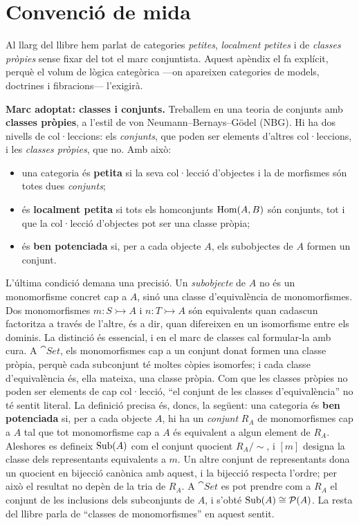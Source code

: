 \chapter{Convenció de mida}
\label{cap:mida}

Al llarg del llibre hem parlat de categories \emph{petites}, \emph{localment petites} i de \emph{classes pròpies} sense fixar del tot el marc conjuntista. Aquest apèndix el fa explícit, perquè el volum de lògica categòrica ---on apareixen categories de models, doctrines i fibracions--- l'exigirà.

\medskip
\noindent\textbf{Marc adoptat: classes i conjunts.} Treballem en una teoria de conjunts amb \textbf{classes pròpies}, a l'estil de von Neumann--Bernays--Gödel (NBG). Hi ha dos nivells de col·leccions: els \emph{conjunts}, que poden ser elements d'altres col·leccions, i les \emph{classes pròpies}, que no. Amb això:
\begin{itemize}
  \item una categoria és \textbf{petita} si la seva col·lecció d'objectes i la de morfismes són totes dues \emph{conjunts};
  \item és \textbf{localment petita} si tots els homconjunts $\operatorname{Hom}(A,B)$ són conjunts, tot i que la col·lecció d'objectes pot ser una classe pròpia;
  \item és \textbf{ben potenciada} si, per a cada objecte $A$, els subobjectes de $A$ formen un conjunt.
\end{itemize}
L'última condició demana una precisió. Un \emph{subobjecte} de $A$ no és un monomorfisme concret cap a $A$, sinó una classe d'equivalència de monomorfismes. Dos monomorfismes $m\colon S\rightarrowtail A$ i $n\colon T\rightarrowtail A$ són equivalents quan cadascun factoritza a través de l'altre, és a dir, quan difereixen en un isomorfisme entre els dominis. La distinció és essencial, i en el marc de classes cal formular-la amb cura. A $\cat{Set}$, els monomorfismes cap a un conjunt donat formen una classe pròpia, perquè cada subconjunt té moltes còpies isomorfes; i cada classe d'equivalència és, ella mateixa, una classe pròpia. Com que les classes pròpies no poden ser elements de cap col·lecció, \enquote{el conjunt de les classes d'equivalència} no té sentit literal. La definició precisa és, doncs, la següent: una categoria és \textbf{ben potenciada} si, per a cada objecte $A$, hi ha un \emph{conjunt} $R_A$ de monomorfismes cap a $A$ tal que tot monomorfisme cap a $A$ és equivalent a algun element de $R_A$. Aleshores es defineix $\operatorname{Sub}(A)$ com el conjunt quocient $R_A/{\sim}$, i $[m]$ designa la classe dels representants equivalents a $m$. Un altre conjunt de representants dona un quocient en bijecció canònica amb aquest, i la bijecció respecta l'ordre; per això el resultat no depèn de la tria de $R_A$. A $\cat{Set}$ es pot prendre com a $R_A$ el conjunt de les inclusions dels subconjunts de $A$, i s'obté $\operatorname{Sub}(A)\cong\mathcal P(A)$. La resta del llibre parla de \enquote{classes de monomorfismes} en aquest sentit.

